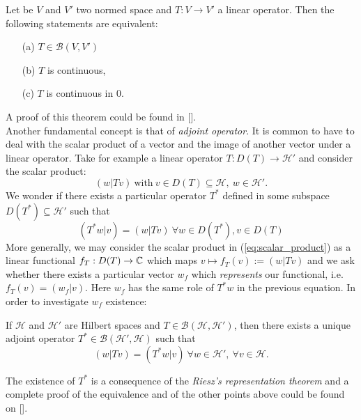 \begin{theorem}
	Let be $V$ and $V'$ two normed space and $T:V\to V'$ a linear operator. Then the following statements are equivalent:
	\begin{itemize}
		\item[(a)] $T\in\mathcal{B}(V,V')$
		\item[(b)] $T$ is continuous,
		\item[(c)] $T$ is continuous in $0$.
	\end{itemize}
\end{theorem}
A proof of this theorem could be found in [\citealp[Th. 2.43]{more}].\\

 Another fundamental concept is that of \textit{adjoint operator}. It is common to have to deal with the scalar product of a vector and the image of another vector under a linear operator. Take for example a linear operator $T:D(T)\to\mathcal{H}'$ and consider the scalar product:
 \begin{equation}
 \label{eq:scalar_product}
 	(w|Tv)\ \text{with}\ v\in D(T)\subseteq \mathcal{H},\ w\in \mathcal{H}'.
 \end{equation}  
  We wonder if there exists a particular operator $T^*$ defined in some subspace $D(T^*)\subseteq\mathcal{H}'$ such that
 \begin{equation}
 	(T^* w|v)=(w|Tv) \ \forall w\in D(T^*), v\in D(T)
 	\label{eq:adjoint_scalar_product}
 \end{equation}
 More generally, we may consider the scalar product in (\ref{eq:scalar_product}) as a linear functional $f_T:D(T)\to {\mathbb C}$ which maps $v\mapsto f_T(v):=(w|Tv)$ and we ask whether there exists a particular vector $w_f$ which \textit{represents} our functional, i.e. $f_T(v)=(w_f|v)$. Here $w_f$ has the same role of $T^*w$ in the previous equation. In order to investigate $w_f$ existence:
 \begin{prop}
 	 If $\mathcal{H}$ and $\mathcal{H}'$ are Hilbert spaces and $T\in\mathcal{B}(\mathcal{H},\mathcal{H}')$, then there exists a unique adjoint operator $T^*\in\mathcal{B}(\mathcal{H}',\mathcal{H})$ such that
 \begin{equation}
 	(w|Tv)=(T^*w|v)\ \forall w\in\mathcal{H}',\ \forall v\in\mathcal{H}.
 \end{equation}
 \end{prop}
 The existence of $T^*$ is a consequence of the \textit{Riesz's representation theorem} and a complete proof of the equivalence and of the other points above could be found on [\citealp[Chapter 2-3]{more}].\\
 
